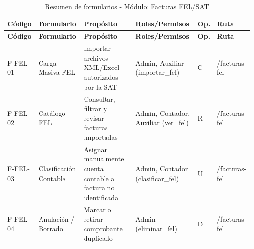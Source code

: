 {
\small
{}
\setlength{\parindent}{0pt}
\begin{xltabular}{\linewidth}{
    >{\raggedright\arraybackslash}p{1.8cm} 
    >{\raggedright\arraybackslash}p{2.8cm} 
    >{\raggedright\arraybackslash}X 
    >{\raggedright\arraybackslash}p{2.5cm} 
    >{\centering\arraybackslash}p{0.8cm} 
    >{\raggedright\arraybackslash}p{2.0cm}
}

    \caption{Resumen de formularios - Módulo: Facturas FEL/SAT} \label{tab:cap4_fel_resumen} \\
    \toprule
    \textbf{Código} & \textbf{Formulario} & \textbf{Propósito} & \textbf{Roles/Permisos} & \textbf{Op.} & \textbf{Ruta} \\
    \midrule
    \endfirsthead

    \toprule
    \textbf{Código} & \textbf{Formulario} & \textbf{Propósito} & \textbf{Roles/Permisos} & \textbf{Op.} & \textbf{Ruta} \\
    \midrule
    \endhead

    \endfoot

\bottomrule
\endlastfoot

    F-FEL-01 & Carga Masiva FEL & Importar archivos XML/Excel autorizados por la SAT & Admin, Auxiliar (\textrm{importar\_fel}) & C & \textrm{/facturas-fel} \\
    \addlinespace
    F-FEL-02 & Catálogo FEL & Consultar, filtrar y revisar facturas importadas & Admin, Contador, Auxiliar (\textrm{ver\_fel}) & R & \textrm{/facturas-fel} \\
    \addlinespace
    F-FEL-03 & Clasificación Contable & Asignar manualmente cuenta contable a factura no identificada & Admin, Contador (\textrm{clasificar\_fel}) & U & \textrm{/facturas-fel} \\
    \addlinespace
    F-FEL-04 & Anulación / Borrado & Marcar o retirar comprobante duplicado & Admin (\textrm{eliminar\_fel}) & D & \textrm{/facturas-fel} \\
\end{xltabular}
}


